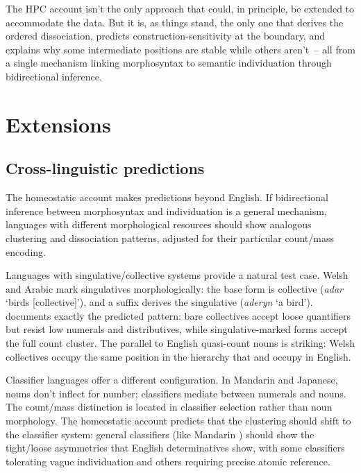 \documentclass[12pt,a4paper]{article}
\begin{document}
The HPC account isn't the only approach that could, in principle, be extended to accommodate the data. But it is, as things stand, the only one that derives the ordered dissociation, predicts construction-sensitivity at the boundary, and explains why some intermediate positions are stable while others aren't~-- all from a single mechanism linking morphosyntax to semantic individuation through bidirectional inference.

\section{Extensions}

\subsection{Cross-linguistic predictions}\label{sec:crossling}

The homeostatic account makes predictions beyond English. If bidirectional inference between morphosyntax and individuation is a general mechanism, languages with different morphological resources should show analogous clustering and dissociation patterns, adjusted for their particular count/mass encoding.

Languages with singulative/collective systems provide a natural test case. Welsh and Arabic mark singulatives morphologically: the base form is collective (\textit{adar} `birds [collective]'), and a suffix derives the singulative (\textit{aderyn} `a bird'). \textcite{grimm2018} documents exactly the predicted pattern: bare collectives accept loose quantifiers but resist low numerals and distributives, while singulative-marked forms accept the full count cluster. The parallel to English quasi-count nouns is striking: Welsh collectives occupy the same position in the hierarchy that  and  occupy in English.

Classifier languages offer a different configuration. In Mandarin and Japanese, nouns don't inflect for number; classifiers mediate between numerals and nouns. The count/mass distinction is located in classifier selection rather than noun morphology. The homeostatic account predicts that the clustering should shift to the classifier system: general classifiers (like Mandarin ) should show the tight/loose asymmetries that English determinatives show, with some classifiers tolerating vague individuation and others requiring precise atomic reference.
\end{document}
